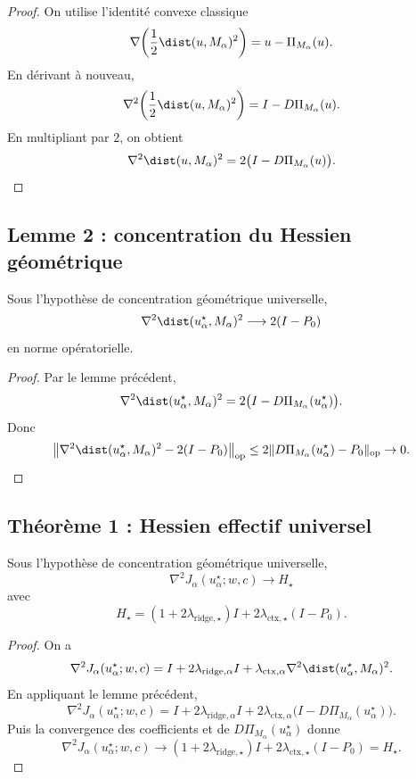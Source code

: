 \begin{proof}
On utilise l'identité convexe classique
\[
\nabla\!\left(\frac12\dist(u,M_\alpha)^2\right)=u-\Pi_{M_\alpha}(u).
\]
En dérivant à nouveau,
\[
\nabla^2\!\left(\frac12\dist(u,M_\alpha)^2\right)
=
I-D\Pi_{M_\alpha}(u).
\]
En multipliant par \(2\), on obtient
\[
\nabla^2 \dist(u,M_\alpha)^2
=
2\bigl(I-D\Pi_{M_\alpha}(u)\bigr).
\]
\end{proof}

\subsection{Lemme 2 : concentration du Hessien géométrique}

\begin{lemma}
Sous l'hypothèse de concentration géométrique universelle,
\[
\nabla^2 \dist(u_\alpha^\star,M_\alpha)^2
\longrightarrow
2(I-P_0)
\]
en norme opératorielle.
\end{lemma}

\begin{proof}
Par le lemme précédent,
\[
\nabla^2 \dist(u_\alpha^\star,M_\alpha)^2
=
2\bigl(I-D\Pi_{M_\alpha}(u_\alpha^\star)\bigr).
\]
Donc
\[
\bigl\|
\nabla^2 \dist(u_\alpha^\star,M_\alpha)^2
-
2(I-P_0)
\bigr\|_{\mathrm{op}}
\le
2\|D\Pi_{M_\alpha}(u_\alpha^\star)-P_0\|_{\mathrm{op}}
\to 0.
\]
\end{proof}

\subsection{Théorème 1 : Hessien effectif universel}

\begin{theorem}
Sous l'hypothèse de concentration géométrique universelle,
\[
\nabla^2 J_\alpha(u_\alpha^\star;w,c)
\longrightarrow
H_\star
\]
avec
\[
H_\star
=
(1+2\lambda_{\mathrm{ridge},\star})I
+
2\lambda_{\mathrm{ctx},\star}(I-P_0).
\]
\end{theorem}

\begin{proof}
On a
\[
\nabla^2 J_\alpha(u_\alpha^\star;w,c)
=
I
+
2\lambda_{\mathrm{ridge},\alpha}I
+
\lambda_{\mathrm{ctx},\alpha}\nabla^2 \dist(u_\alpha^\star,M_\alpha)^2.
\]
En appliquant le lemme précédent,
\[
\nabla^2 J_\alpha(u_\alpha^\star;w,c)
=
I
+
2\lambda_{\mathrm{ridge},\alpha}I
+
2\lambda_{\mathrm{ctx},\alpha}\bigl(I-D\Pi_{M_\alpha}(u_\alpha^\star)\bigr).
\]
Puis la convergence des coefficients et de \(D\Pi_{M_\alpha}(u_\alpha^\star)\) donne
\[
\nabla^2 J_\alpha(u_\alpha^\star;w,c)\to
(1+2\lambda_{\mathrm{ridge},\star})I
+
2\lambda_{\mathrm{ctx},\star}(I-P_0)
=
H_\star.
\]
\end{proof}

